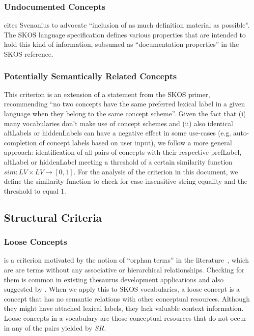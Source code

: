 \subsubsection{Undocumented Concepts}
\cite{Aitchison2000} cites Svenonius to advocate ``inclusion of as much definition material as possible''. The SKOS language specification defines various properties that are intended to hold this kind of information, subsumed as ``documentation properties'' in the SKOS reference.

\subsubsection{Potentially Semantically Related Concepts} 
This criterion is an extension of a statement from the SKOS primer, recommending ``no two concepts have the same preferred lexical label in a given language when they belong to the same concept scheme''. Given the fact that (i) many vocabularies don’t make use of concept schemes and (ii) also identical altLabels or hiddenLabels can have a negative effect in some use-cases (e.g, auto-completion of concept labels based on user input), we follow a more general approach: identification of all pairs of concepts with their respective prefLabel, altLabel or hiddenLabel meeting a threshold of a certain similarity function $sim:LV \times LV \rightarrow [0,1]$. For the analysis of the criterion in this document, we define the similarity function  to check for case-insensitive string equality and the threshold to equal 1.


\subsection{Structural Criteria}


\subsubsection{Loose Concepts} is a criterion motivated by the notion of ``orphan terms'' in the literature~\cite{Hedden2010}, which are are terms without any associative or hierarchical relationships. Checking for them is common in existing thesaurus development applications and also suggested by \cite{Z39.19:2005}. When we apply this to SKOS vocabularies, a loose concept is a concept that has no semantic relations with other conceptual resources. Although they might have attached lexical labels, they lack valuable context information. Loose concepts in a vocabulary are those conceptual resources that do not occur in any of the pairs yielded by $SR$.

